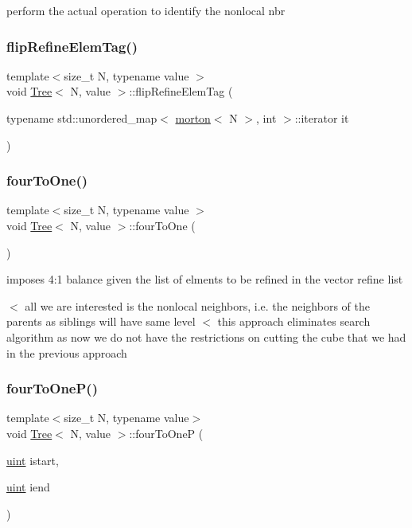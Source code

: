 perform the actual operation to identify the nonlocal nbr \mbox{\label{classTree_a77e16d7a249bca09cf3deff800b85789}} 
\subsubsection{\texorpdfstring{flip\+Refine\+Elem\+Tag()}{flipRefineElemTag()}}
{\footnotesize\ttfamily template$<$size\+\_\+t N, typename value $>$ \\
void \mbox{\hyperlink{classTree}{Tree}}$<$ N, value $>$\+::flip\+Refine\+Elem\+Tag (\begin{DoxyParamCaption}\item[{typename std\+::unordered\+\_\+map$<$ \mbox{\hyperlink{definitions_8h_af8682350bd8bb38ee9023f7a0a310add}{morton}}$<$ N $>$, int $>$\+::iterator}]{it }\end{DoxyParamCaption})}

\mbox{\label{classTree_a645682dbe12c75b89752e94b4c13faa4}} 
\subsubsection{\texorpdfstring{four\+To\+One()}{fourToOne()}}
{\footnotesize\ttfamily template$<$size\+\_\+t N, typename value $>$ \\
void \mbox{\hyperlink{classTree}{Tree}}$<$ N, value $>$\+::four\+To\+One (\begin{DoxyParamCaption}{ }\end{DoxyParamCaption})}

imposes 4\+:1 balance given the list of elments to be refined in the vector refine list

$<$ all we are interested is the nonlocal neighbors, i.\+e. the neighbors of the parents as siblings will have same level $<$ this approach eliminates search algorithm as now we do not have the restrictions on cutting the cube that we had in the previous approach \mbox{\label{classTree_a79d852515f810c7d67d3b8f7d157a03b}} 
\subsubsection{\texorpdfstring{four\+To\+One\+P()}{fourToOneP()}}
{\footnotesize\ttfamily template$<$size\+\_\+t N, typename value$>$ \\
void \mbox{\hyperlink{classTree}{Tree}}$<$ N, value $>$\+::four\+To\+OneP (\begin{DoxyParamCaption}\item[{\mbox{\hyperlink{definitions_8h_a69aa29b598b851b0640aa225a9e5d61d}{uint}}}]{istart,  }\item[{\mbox{\hyperlink{definitions_8h_a69aa29b598b851b0640aa225a9e5d61d}{uint}}}]{iend }\end{DoxyParamCaption})}

